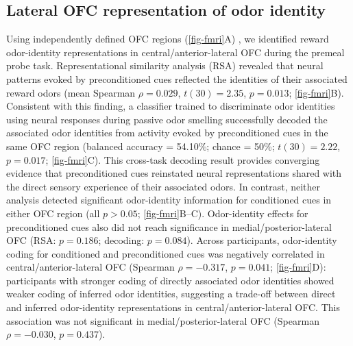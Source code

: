 \documentclass[12pt,letterpaper]{article}
\begin{document}
\label{fig-beh}

\par\endgroup\bigskip




\subsection*{Lateral OFC representation of odor identity}


Using independently defined OFC regions (\autoref{fig-fmri}A) \cite{kahnt2012connectivity}, we identified reward odor-identity representations in central/anterior-lateral OFC during the premeal probe task. Representational similarity analysis (RSA) revealed that neural patterns evoked by preconditioned cues reflected the identities of their associated reward odors (mean Spearman $\rho = 0.029$, $t(30) = 2.35$, $p = 0.013$; \autoref{fig-fmri}B). Consistent with this finding, a classifier trained to discriminate odor identities using neural responses during passive odor smelling successfully decoded the associated odor identities from activity evoked by preconditioned cues in the same OFC region (balanced accuracy = 54.10\%; chance = 50\%; $t(30) = 2.22$, $p = 0.017$; \autoref{fig-fmri}C). This cross-task decoding result provides converging evidence that preconditioned cues reinstated neural representations shared with the direct sensory experience of their associated odors. In contrast, neither analysis detected significant odor-identity information for conditioned cues in either OFC region (all $p > 0.05$; \autoref{fig-fmri}B–C). Odor-identity effects for preconditioned cues also did not reach significance in medial/posterior-lateral OFC (RSA: $p = 0.186$; decoding: $p = 0.084$). Across participants, odor-identity coding for conditioned and preconditioned cues was negatively correlated in central/anterior-lateral OFC (Spearman $\rho = -0.317$, $p = 0.041$; \autoref{fig-fmri}D): participants with stronger coding of directly associated odor identities showed weaker coding of inferred odor identities, suggesting a trade-off between direct and inferred odor-identity representations in central/anterior-lateral OFC. This association was not significant in medial/posterior-lateral OFC (Spearman $\rho = -0.030$, $p = 0.437$).  




\par\bigskip\begingroup
{}
\end{document}
